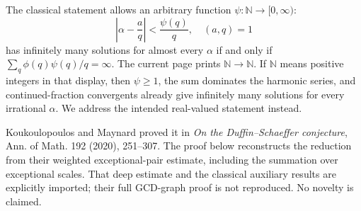 The classical statement allows an arbitrary function $\psi:\mathbb N\to[0,\infty)$:
\[
 \left|\alpha-\frac aq\right|<\frac{\psi(q)}q,\quad (a,q)=1
 \tag{1}
\]
has infinitely many solutions for almost every $\alpha$ if and only if
$\sum_q\phi(q)\psi(q)/q=\infty$.
The current page prints $\mathbb N\to\mathbb N$. If $\mathbb N$ means positive integers in that display, then $\psi\ge1$, the sum dominates the harmonic series, and continued-fraction convergents already give infinitely many solutions for every irrational $\alpha$. We address the intended real-valued statement instead.

Koukoulopoulos and Maynard proved it in \emph{On the Duffin--Schaeffer conjecture}, Ann. of Math. 192 (2020), 251--307.
The proof below reconstructs the reduction from their weighted exceptional-pair estimate, including the summation over exceptional scales. That deep estimate and the classical auxiliary results are explicitly imported; their full GCD-graph proof is not reproduced. No novelty is claimed.
